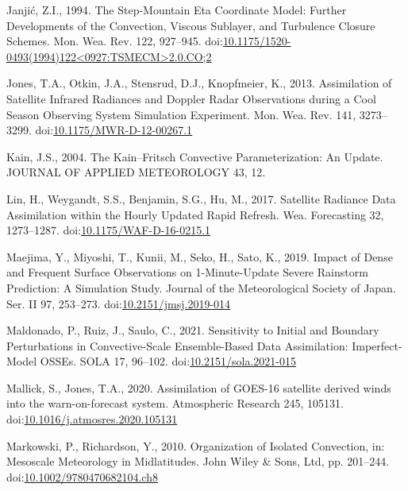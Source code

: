 \documentclass[final,5p,times,twocolumn,authoryear]{elsarticle} %
\begin{document}
\leavevmode\hypertarget{ref-janjic1994}{}%
Janjić, Z.I., 1994. The Step-Mountain Eta Coordinate Model: Further Developments of the Convection, Viscous Sublayer, and Turbulence Closure Schemes. Mon. Wea. Rev. 122, 927--945. doi:\href{https://doi.org/10.1175/1520-0493(1994)122\%3C0927:TSMECM\%3E2.0.CO;2}{10.1175/1520-0493(1994)122\textless0927:TSMECM\textgreater2.0.CO;2}

\leavevmode\hypertarget{ref-jones2013}{}%
Jones, T.A., Otkin, J.A., Stensrud, D.J., Knopfmeier, K., 2013. Assimilation of Satellite Infrared Radiances and Doppler Radar Observations during a Cool Season Observing System Simulation Experiment. Mon. Wea. Rev. 141, 3273--3299. doi:\href{https://doi.org/10.1175/MWR-D-12-00267.1}{10.1175/MWR-D-12-00267.1}

\leavevmode\hypertarget{ref-kain2004}{}%
Kain, J.S., 2004. The Kain--Fritsch Convective Parameterization: An Update. JOURNAL OF APPLIED METEOROLOGY 43, 12.

\leavevmode\hypertarget{ref-lin2017a}{}%
Lin, H., Weygandt, S.S., Benjamin, S.G., Hu, M., 2017. Satellite Radiance Data Assimilation within the Hourly Updated Rapid Refresh. Wea. Forecasting 32, 1273--1287. doi:\href{https://doi.org/10.1175/WAF-D-16-0215.1}{10.1175/WAF-D-16-0215.1}

\leavevmode\hypertarget{ref-maejima2019}{}%
Maejima, Y., Miyoshi, T., Kunii, M., Seko, H., Sato, K., 2019. Impact of Dense and Frequent Surface Observations on 1-Minute-Update Severe Rainstorm Prediction: A Simulation Study. Journal of the Meteorological Society of Japan. Ser. II 97, 253--273. doi:\href{https://doi.org/10.2151/jmsj.2019-014}{10.2151/jmsj.2019-014}

\leavevmode\hypertarget{ref-maldonado2021}{}%
Maldonado, P., Ruiz, J., Saulo, C., 2021. Sensitivity to Initial and Boundary Perturbations in Convective-Scale Ensemble-Based Data Assimilation: Imperfect-Model OSSEs. SOLA 17, 96--102. doi:\href{https://doi.org/10.2151/sola.2021-015}{10.2151/sola.2021-015}

\leavevmode\hypertarget{ref-mallick2020}{}%
Mallick, S., Jones, T.A., 2020. Assimilation of GOES-16 satellite derived winds into the warn-on-forecast system. Atmospheric Research 245, 105131. doi:\href{https://doi.org/10.1016/j.atmosres.2020.105131}{10.1016/j.atmosres.2020.105131}

\leavevmode\hypertarget{ref-markowski2010}{}%
Markowski, P., Richardson, Y., 2010. Organization of Isolated Convection, in: Mesoscale Meteorology in Midlatitudes. John Wiley \& Sons, Ltd, pp. 201--244. doi:\href{https://doi.org/10.1002/9780470682104.ch8}{10.1002/9780470682104.ch8}
\end{document}
